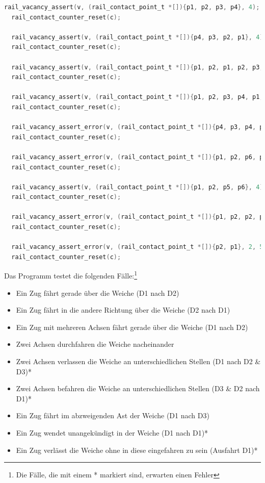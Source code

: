 \begin{lstlisting}[caption={Ausschnitt des Testprogramms für Weichen},label={lst:Testprogramm2},language=C]
  rail_vacancy_assert(v, (rail_contact_point_t *[]){p1, p2, p3, p4}, 4);
  rail_contact_counter_reset(c);

  rail_vacancy_assert(v, (rail_contact_point_t *[]){p4, p3, p2, p1}, 4);
  rail_contact_counter_reset(c);

  rail_vacancy_assert(v, (rail_contact_point_t *[]){p1, p2, p1, p2, p3, p4, p3, p4}, 8);
  rail_contact_counter_reset(c);

  rail_vacancy_assert(v, (rail_contact_point_t *[]){p1, p2, p3, p4, p1, p2, p3, p4}, 8);
  rail_contact_counter_reset(c);

  rail_vacancy_assert_error(v, (rail_contact_point_t *[]){p4, p3, p4, p3, p2, p1, p5, p6}, 8, 4);
  rail_contact_counter_reset(c);

  rail_vacancy_assert_error(v, (rail_contact_point_t *[]){p1, p2, p6, p5, p3, p4, p3, p4}, 8, 3);
  rail_contact_counter_reset(c);

  rail_vacancy_assert(v, (rail_contact_point_t *[]){p1, p2, p5, p6}, 4);
  rail_contact_counter_reset(c);

  rail_vacancy_assert_error(v, (rail_contact_point_t *[]){p1, p2, p2, p1}, 4, 6);
  rail_contact_counter_reset(c);

  rail_vacancy_assert_error(v, (rail_contact_point_t *[]){p2, p1}, 2, 5);
  rail_contact_counter_reset(c);
\end{lstlisting}

Das Programm testet die folgenden Fälle:\footnote{Die Fälle, die mit einem * markiert sind, erwarten einen Fehler}
\begin{itemize}
    \item Ein Zug fährt gerade über die Weiche (D1 nach D2)
    \item Ein Zug fährt in die andere Richtung über die Weiche (D2 nach D1)
    \item Ein Zug mit mehreren Achsen fährt gerade über die Weiche (D1 nach D2)
    \item Zwei Achsen durchfahren die Weiche nacheinander
    \item Zwei Achsen verlassen die Weiche an unterschiedlichen Stellen (D1 nach D2 \& D3)*
    \item Zwei Achsen befahren die Weiche an unterschiedlichen Stellen (D3 \& D2 nach D1)*
    \item Ein Zug fährt im abzweigenden Ast der Weiche (D1 nach D3)
    \item Ein Zug wendet unangekündigt in der Weiche (D1 nach D1)*
    \item Ein Zug verlässt die Weiche ohne in diese eingefahren zu sein (Ausfahrt D1)*
\end{itemize}


